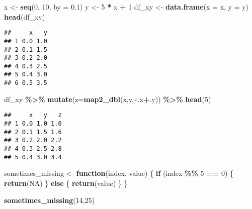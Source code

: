 \documentclass[
]{article}
\newenvironment{Shaded}{\begin{snugshade}}{\end{snugshade}}
\newcommand{\AttributeTok}[1]{\textcolor[rgb]{0.13,0.29,0.53}{#1}}
\newcommand{\ConstantTok}[1]{\textcolor[rgb]{0.56,0.35,0.01}{#1}}
\newcommand{\ControlFlowTok}[1]{\textcolor[rgb]{0.13,0.29,0.53}{\textbf{#1}}}
\newcommand{\DecValTok}[1]{\textcolor[rgb]{0.00,0.00,0.81}{#1}}
\newcommand{\FloatTok}[1]{\textcolor[rgb]{0.00,0.00,0.81}{#1}}
\newcommand{\FunctionTok}[1]{\textcolor[rgb]{0.13,0.29,0.53}{\textbf{#1}}}
\newcommand{\NormalTok}[1]{#1}
\newcommand{\OtherTok}[1]{\textcolor[rgb]{0.56,0.35,0.01}{#1}}
\newcommand{\SpecialCharTok}[1]{\textcolor[rgb]{0.81,0.36,0.00}{\textbf{#1}}}
\begin{document}
\begin{Shaded}
\begin{Highlighting}[]
\NormalTok{x }\OtherTok{\textless{}{-}} \FunctionTok{seq}\NormalTok{(}\DecValTok{0}\NormalTok{, }\DecValTok{10}\NormalTok{, }\AttributeTok{by =} \FloatTok{0.1}\NormalTok{)}
\NormalTok{y }\OtherTok{\textless{}{-}} \DecValTok{5} \SpecialCharTok{*}\NormalTok{ x }\SpecialCharTok{+} \DecValTok{1}
\NormalTok{df\_xy }\OtherTok{\textless{}{-}} \FunctionTok{data.frame}\NormalTok{(}\AttributeTok{x =}\NormalTok{ x, }\AttributeTok{y =}\NormalTok{ y)}
\FunctionTok{head}\NormalTok{(df\_xy)}
\end{Highlighting}
\end{Shaded}

\begin{verbatim}
##     x   y
## 1 0.0 1.0
## 2 0.1 1.5
## 3 0.2 2.0
## 4 0.3 2.5
## 5 0.4 3.0
## 6 0.5 3.5
\end{verbatim}

\begin{Shaded}
\begin{Highlighting}[]
\NormalTok{df\_xy }\SpecialCharTok{\%\textgreater{}\%}
\FunctionTok{mutate}\NormalTok{(}\AttributeTok{z=}\FunctionTok{map2\_dbl}\NormalTok{(x,y,}\SpecialCharTok{\textasciitilde{}}\NormalTok{.x}\SpecialCharTok{+}\NormalTok{.y)) }\SpecialCharTok{\%\textgreater{}\%}
\FunctionTok{head}\NormalTok{(}\DecValTok{5}\NormalTok{)}
\end{Highlighting}
\end{Shaded}

\begin{verbatim}
##     x   y   z
## 1 0.0 1.0 1.0
## 2 0.1 1.5 1.6
## 3 0.2 2.0 2.2
## 4 0.3 2.5 2.8
## 5 0.4 3.0 3.4
\end{verbatim}

\begin{Shaded}
\begin{Highlighting}[]
\NormalTok{sometimes\_missing }\OtherTok{\textless{}{-}} \ControlFlowTok{function}\NormalTok{(index, value) \{}
  \ControlFlowTok{if}\NormalTok{ (index }\SpecialCharTok{\%\%} \DecValTok{5} \SpecialCharTok{==} \DecValTok{0}\NormalTok{) \{}
    \FunctionTok{return}\NormalTok{(}\ConstantTok{NA}\NormalTok{)}
\NormalTok{  \} }\ControlFlowTok{else}\NormalTok{ \{}
    \FunctionTok{return}\NormalTok{(value)}
\NormalTok{  \}}
\NormalTok{\}}

\FunctionTok{sometimes\_missing}\NormalTok{(}\DecValTok{14}\NormalTok{,}\DecValTok{25}\NormalTok{)}
\end{Highlighting}
\end{Shaded}
\end{document}
